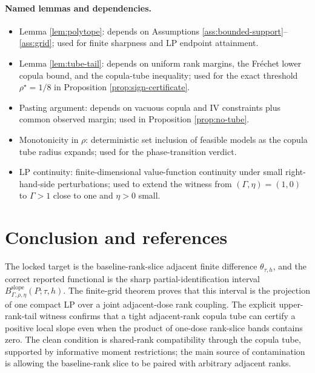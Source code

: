 \documentclass[11pt]{article}
\theoremstyle{definition}
\theoremstyle{plain}
\theoremstyle{remark}
\begin{document}
\paragraph{Named lemmas and dependencies.}
\begin{itemize}[leftmargin=*]
\item Lemma \ref{lem:polytope}: depends on Assumptions \ref{ass:bounded-support}--\ref{ass:grid}; used for finite sharpness and LP endpoint attainment.
\item Lemma \ref{lem:tube-tail}: depends on uniform rank margins, the Fr\'echet lower copula bound, and the copula-tube inequality; used for the exact threshold \(\rho^\star=1/8\) in Proposition \ref{prop:sign-certificate}.
\item Pasting argument: depends on vacuous copula and IV constraints plus common observed margin; used in Proposition \ref{prop:no-tube}.
\item Monotonicity in \(\rho\): deterministic set inclusion of feasible models as the copula tube radius expands; used for the phase-transition verdict.
\item LP continuity: finite-dimensional value-function continuity under small right-hand-side perturbations; used to extend the witness from \((\Gamma,\eta)=(1,0)\) to \(\Gamma>1\) close to one and \(\eta>0\) small.
\end{itemize}

\section{Conclusion and references}
The locked target is the baseline-rank-slice adjacent finite difference \(\theta_{\tau,h}\), and the correct reported functional is the sharp partial-identification interval \(B_{\Gamma,\rho,\eta}^{\mathrm{slope}}(P;\tau,h)\).  The finite-grid theorem proves that this interval is the projection of one compact LP over a joint adjacent-dose rank coupling.  The explicit upper-rank-tail witness confirms that a tight adjacent-rank copula tube can certify a positive local slope even when the product of one-dose rank-slice bands contains zero.  The clean condition is shared-rank compatibility through the copula tube, supported by informative moment restrictions; the main source of contamination is allowing the baseline-rank slice to be paired with arbitrary adjacent ranks.
\end{document}
